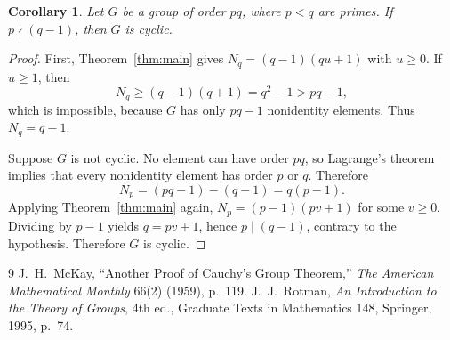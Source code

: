 \documentclass[11pt,letterpaper]{article}
\newtheorem{corollary}{Corollary}
\begin{document}
\begin{corollary}\label{cor:pq}
Let $G$ be a group of order $pq$, where $p<q$ are primes. If $p\nmid(q-1)$, then $G$ is cyclic.
\end{corollary}

\begin{proof}
First, Theorem~\ref{thm:main} gives $N_q=(q-1)(qu+1)$ with $u\ge0$. If $u\ge1$, then
\[
N_q\ge(q-1)(q+1)=q^2-1>pq-1,
\]
which is impossible, because $G$ has only $pq-1$ nonidentity elements. Thus $N_q=q-1$.

Suppose $G$ is not cyclic. No element can have order $pq$, so Lagrange's theorem implies that every nonidentity element has order $p$ or $q$. Therefore
\[
N_p=(pq-1)-(q-1)=q(p-1).
\]
Applying Theorem~\ref{thm:main} again, $N_p=(p-1)(pv+1)$ for some $v\ge0$. Dividing by $p-1$ yields $q=pv+1$, hence $p\mid(q-1)$, contrary to the hypothesis. Therefore $G$ is cyclic.
\end{proof}

\begin{thebibliography}{9}
\setlength{\itemsep}{0.2em}
 J.~H.~McKay, ``Another Proof of Cauchy's Group Theorem,'' \emph{The American Mathematical Monthly} 66(2) (1959), p.~119.
 J.~J.~Rotman, \emph{An Introduction to the Theory of Groups}, 4th ed., Graduate Texts in Mathematics 148, Springer, 1995, p.~74.
\end{thebibliography}
\end{document}
